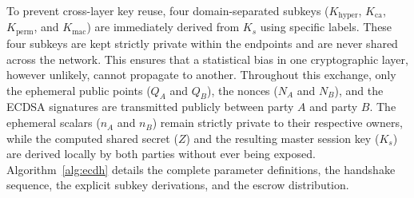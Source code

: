 \documentclass[pdflatex,sn-mathphys-num]{sn-jnl}%
\theoremstyle{thmstyleone}%
\theoremstyle{thmstyletwo}%
\theoremstyle{thmstylethree}%
\begin{document}
To prevent cross-layer key reuse, four domain-separated subkeys ($K_{\mathrm{hyper}}$, $K_{\mathrm{ca}}$, $K_{\mathrm{perm}}$, and $K_{\mathrm{mac}}$) are immediately derived from $K_s$ using specific labels. These four subkeys are kept strictly private within the endpoints and are never shared across the network. This ensures that a statistical bias in one cryptographic layer, however unlikely, cannot propagate to another. Throughout this exchange, only the ephemeral public points ($Q_A$ and $Q_B$), the nonces ($N_A$ and $N_B$), and the ECDSA signatures are transmitted publicly between party $A$ and party $B$. The ephemeral scalars ($n_A$ and $n_B$) remain strictly private to their respective owners, while the computed shared secret ($Z$) and the resulting master session key ($K_s$) are derived locally by both parties without ever being exposed. Algorithm~\ref{alg:ecdh} details the complete parameter definitions, the handshake sequence, the explicit subkey derivations, and the escrow distribution.
\end{document}
